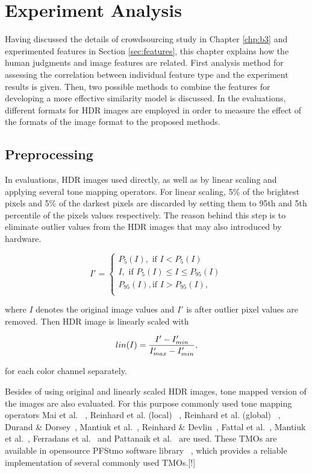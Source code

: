 \chapter{Experiment Analysis}
\label{chp:b4}
Having discussed the details of crowdsourcing study in Chapter \ref{chp:b3} and experimented features in Section \ref{sec:features}, this chapter explains how the human judgments and image features are related. First analysis method for assessing the correlation between individual feature type and the experiment results is given. Then, two possible methods to combine the features for developing a more effective similarity model is discussed. In the evaluations, different formats for HDR images are employed in order to measure the effect of the formats of the image format to the proposed methods. 

\section{Preprocessing}
In evaluations, HDR images used directly, as well as by linear scaling and applying several tone mapping operators. For linear scaling, 5\% of the brightest pixels and 5\% of the darkest pixels are discarded by setting them to 95th and 5th percentile of the pixels values respectively. The reason behind this step is to eliminate outlier values from the HDR images that may also introduced by hardware. 

\begin{equation}
    I' = \begin{cases}
    P_5 (I), \text{ if $I < P_5(I)$} \\
    I, \text{ if $P_5(I) \leq I \leq P_{95}(I) $} \\
    P_{95}(I), \text{if $I > P_{95}(I)$}, \\
    \end{cases}
\end{equation}

where $I$ denotes the original image values and $I'$ is after outlier pixel values are removed. Then HDR image is linearly scaled with

\begin{equation}
    lin(I)  = {{I' - I'_{min}} \over {I'_{max} - I'_{min}}}, 
\end{equation}

for each color channel separately.

Besides of using original and linearly scaled HDR images, tone mapped version of the images are also evaluated. For this purpose commonly used tone mapping operators Mai et al. ~\cite{mai2011subjective}, Reinhard et al. (local) ~\cite{reinhard2002photographic}, Reinhard et al. (global) ~\cite{reinhard2002photographic}, Durand \& Dorsey~\cite{durand2002fast}, Mantiuk et al.~\cite{mantiuk2006backward}, Reinhard \& Devlin~\cite{reinhard2005dynamic}, Fattal et al.~\cite{durand2002fast}, Mantiuk et al.~\cite{mantiuk2008modeling}, Ferradans et al.~\cite{ferradans2011analysis} and Pattanaik et al.~\cite{pattanaik2000time} are used. These TMOs are available in opensource PFStmo software library ~\cite{mantiuk2007high}, which provides a reliable implementation of several commonly used TMOs.[!]


